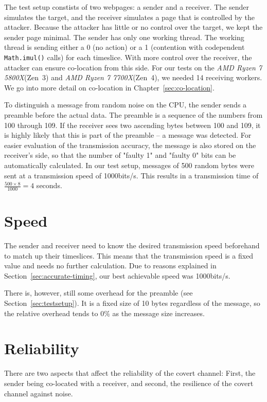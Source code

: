 \documentclass[11pt,
  titlepage=false,
]{scrreprt}
\begin{document}
The test setup constists of two webpages: a sender and a receiver.
The sender simulates the target, and the receiver simulates a page that is controlled by the attacker.
Because the attacker has little or no control over the target, we kept the sender page minimal.
The sender has only one working thread.
The working thread is sending either a 0 (no action) or a 1 (contention with codependent \texttt{Math.imul()} calls) for each timeslice.
With more control over the receiver, the attacker can ensure co-location from this side.
For our tests on the \textit{AMD Ryzen 7 5800X}(Zen~3) and \textit{AMD Ryzen 7 7700X}(Zen~4), we needed 14 receiving workers.
We go into more detail on co-location in Chapter~\ref{sec:co-location}.

To distinguish a message from random noise on the CPU, the sender sends a preamble before the actual data.
The preamble is a sequence of the numbers from 100 through 109.
If the receiver sees two ascending bytes between 100 and 109, it is highly likely that this is part of the preamble --
a message was detected.
For easier evaluation of the transmission accuracy, the message is also stored on the receiver's side,
so that the number of "faulty 1" and "faulty 0" bits can be automatically calculated.
In our test setup, messages of 500 random bytes were sent at a transmission speed of 1000bits/s.
This results in a transmission time of $\frac{500 \times 8}{1000} = 4$ seconds.

\section{Speed}
The sender and receiver need to know the desired transmission speed beforehand to match up their timeslices.
This means that the transmission speed is a fixed value and needs no further calculation.
Due to reasons explained in Section~\ref{sec:accurate-timing}, our best achievable speed was 1000bits/s.

There is, however, still some overhead for the preamble (see Section~\ref{sec:testsetup}).
It is a fixed size of 10 bytes regardless of the message,
so the relative overhead tends to $0\%$ as the message size increases.

\section{Reliability}
There are two aspects that affect the reliability of the covert channel:
First, the sender being co-located with a receiver, and second, the resilience of the covert channel against noise.
\end{document}
